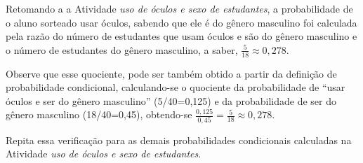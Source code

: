 Retomando a a Atividade \emph{uso de óculos e sexo de estudantes}, a probabilidade de o aluno sorteado usar óculos, sabendo que ele é do gênero masculino foi calculada pela razão do número de estudantes que usam óculos e são do gênero masculino e o número de estudantes do gênero masculino, a saber, \(\frac{5}{18}\approx 0,278\).

Observe que esse quociente, pode ser também obtido a partir da definição de probabilidade condicional, calculando-se o quociente da probabilidade de “usar óculos e ser do gênero masculino” (5/40=0,125) e da probabilidade de ser do gênero masculino (18/40=0,45), obtendo-se \(\displaystyle{\frac{0,125}{0,45}=\frac{5}{18}\approx 0,278}\).

Repita essa verificação para as demais probabilidades condicionais calculadas na Atividade \emph{uso de óculos e sexo de estudantes}.


